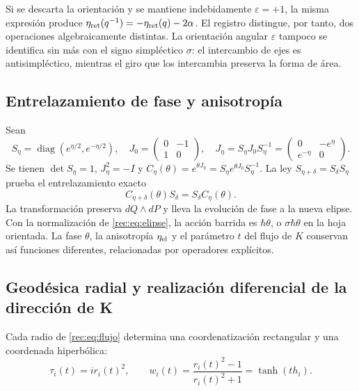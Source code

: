 Si se descarta la orientación y se mantiene indebidamente \(\varepsilon=+1\), la misma expresión produce \(\eta_{\rm ret}(q^{-1})=-\eta_{\rm ret}(q)-2\alpha\). El registro distingue, por tanto, dos operaciones algebraicamente distintas. La orientación angular \(\varepsilon\) tampoco se identifica sin más con el signo simpléctico \(\sigma\): el intercambio de ejes es antisimpléctico, mientras el giro que los intercambia preserva la forma de área.

\subsection{Entrelazamiento de fase y anisotropía}

Sean
\[
 S_\eta=\operatorname{diag}(e^{\eta/2},e^{-\eta/2}),\quad
 J_0=\begin{pmatrix}0&-1\\1&0\end{pmatrix},\quad
 J_\eta=S_\eta J_0S_\eta^{-1}
       =\begin{pmatrix}0&-e^\eta\\e^{-\eta}&0\end{pmatrix}.
\]
Se tienen \(\det S_\eta=1\), \(J_\eta^2=-I\) y
\(C_\eta(\theta)=e^{\theta J_\eta}=S_\eta e^{\theta J_0}S_\eta^{-1}\).
La ley \(S_{\eta+\delta}=S_\delta S_\eta\) prueba el entrelazamiento exacto
\begin{equation}
 C_{\eta+\delta}(\theta)S_\delta=S_\delta C_\eta(\theta).
 \label{rec:eq:entrelazamiento}
\end{equation}
La transformación preserva \(dQ\wedge dP\) y lleva la evolución de fase a la nueva elipse. Con la normalización de \eqref{rec:eq:elipse}, la acción barrida es \(\hbar\theta\), o \(\sigma\hbar\theta\) en la hoja orientada. La fase \(\theta\), la anisotropía \(\eta_{\rm el}\) y el parámetro \(t\) del flujo de \(K\) conservan así funciones diferentes, relacionadas por operadores explícitos.

\subsection{Geodésica radial y realización diferencial de la dirección de K}

Cada radio de \eqref{rec:eq:flujo} determina una coordenatización rectangular y una coordenada hiperbólica:
\[
 \tau_i(t)=ir_i(t)^2,\qquad
 w_i(t)=\frac{r_i(t)^2-1}{r_i(t)^2+1}=\tanh(th_i).
\]

